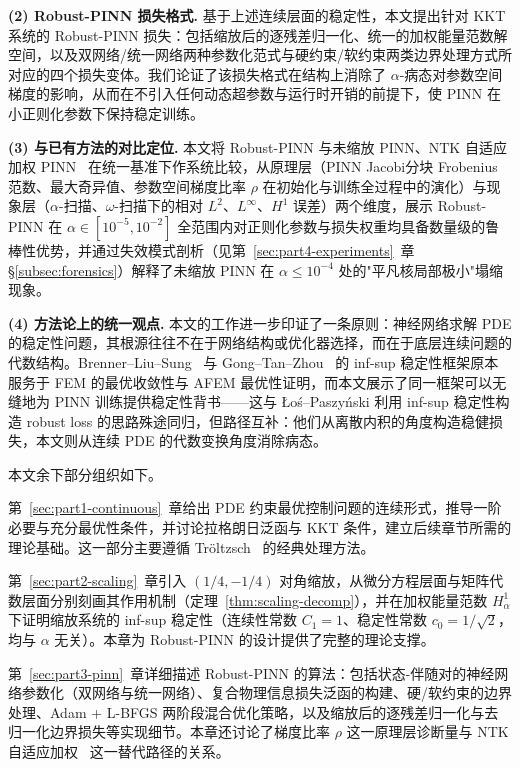 \documentclass{xmu}
\theoremstyle{plain}
\theoremstyle{remark}
\begin{document}
\textbf{(2) Robust-PINN 损失格式.}
基于上述连续层面的稳定性，本文提出针对 KKT 系统的 Robust-PINN 损失：包括缩放后的逐残差归一化、统一的加权能量范数解空间，以及双网络/统一网络两种参数化范式与硬约束/软约束两类边界处理方式所对应的四个损失变体。我们论证了该损失格式在结构上消除了 $\alpha$-病态对参数空间梯度的影响，从而在不引入任何动态超参数与运行时开销的前提下，使 PINN 在小正则化参数下保持稳定训练。

\textbf{(3) 与已有方法的对比定位.}
本文将 Robust-PINN 与未缩放 PINN、NTK 自适应加权 PINN~\cite{27,29} 在统一基准下作系统比较，从原理层（PINN Jacobi分块 Frobenius 范数、最大奇异值、参数空间梯度比率 $\rho$ 在初始化与训练全过程中的演化）与现象层（$\alpha$-扫描、$\omega$-扫描下的相对 $L^2$、$L^\infty$、$H^1$ 误差）两个维度，展示 Robust-PINN 在 $\alpha\in[10^{-5},10^{-2}]$ 全范围内对正则化参数与损失权重均具备数量级的鲁棒性优势，并通过失效模式剖析（见第~\ref{sec:part4-experiments}~章 §\ref{subsec:forensics}）解释了未缩放 PINN 在 $\alpha\le 10^{-4}$ 处的"平凡核局部极小"塌缩现象。

\textbf{(4) 方法论上的统一观点.}
本文的工作进一步印证了一条原则：神经网络求解 PDE 的稳定性问题，其根源往往不在于网络结构或优化器选择，而在于底层连续问题的代数结构。Brenner--Liu--Sung~\cite{4} 与 Gong--Tan--Zhou~\cite{3} 的 inf-sup 稳定性框架原本服务于 FEM 的最优收敛性与 AFEM 最优性证明，而本文展示了同一框架可以无缝地为 PINN 训练提供稳定性背书——这与 Łoś--Paszyński 利用 inf-sup 稳定性构造 robust loss 的思路殊途同归，但路径互补：他们从离散内积的角度构造稳健损失，本文则从连续 PDE 的代数变换角度消除病态。

\label{subsec:intro-organization}

本文余下部分组织如下。

第~\ref{sec:part1-continuous}~章给出 PDE 约束最优控制问题的连续形式，推导一阶必要与充分最优性条件，并讨论拉格朗日泛函与 KKT 条件，建立后续章节所需的理论基础。这一部分主要遵循 Tröltzsch~\cite{1} 的经典处理方法。

第~\ref{sec:part2-scaling}~章引入 $(1/4,-1/4)$ 对角缩放，从微分方程层面与矩阵代数层面分别刻画其作用机制（定理~\ref{thm:scaling-decomp}），并在加权能量范数 $H_\alpha^1$ 下证明缩放系统的 inf-sup 稳定性（连续性常数 $C_1=1$、稳定性常数 $c_0=1/\sqrt{2}$，均与 $\alpha$ 无关）。本章为 Robust-PINN 的设计提供了完整的理论支撑。

第~\ref{sec:part3-pinn}~章详细描述 Robust-PINN 的算法：包括状态-伴随对的神经网络参数化（双网络与统一网络）、复合物理信息损失泛函的构建、硬/软约束的边界处理、Adam + L-BFGS 两阶段混合优化策略，以及缩放后的逐残差归一化与去归一化边界损失等实现细节。本章还讨论了梯度比率 $\rho$ 这一原理层诊断量与 NTK 自适应加权~\cite{29} 这一替代路径的关系。
\end{document}
